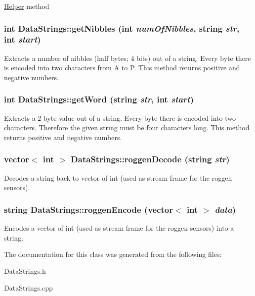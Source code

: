 \label{classDataStrings_ae3279bea5f297a4244c726231489397d}
\hyperlink{classHelper}{Helper} method \hypertarget{classDataStrings_aa2df0794f9ec86503a238a457b963b96}{
\subsubsection[{getNibbles}]{\setlength{\rightskip}{0pt plus 5cm}int DataStrings::getNibbles (int {\em numOfNibbles}, \/  string {\em str}, \/  int {\em start})}}
\label{classDataStrings_aa2df0794f9ec86503a238a457b963b96}
Extracts a number of nibbles (half bytes; 4 bits) out of a string. Every byte there is encoded into two characters from A to P. This method returns positive and negative numbers. \hypertarget{classDataStrings_abb6df04a95c423a6b3f8e9bc5c64c40a}{
\subsubsection[{getWord}]{\setlength{\rightskip}{0pt plus 5cm}int DataStrings::getWord (string {\em str}, \/  int {\em start})}}
\label{classDataStrings_abb6df04a95c423a6b3f8e9bc5c64c40a}
Extracts a 2 byte value out of a string. Every byte there is encoded into two characters. Therefore the given string must be four characters long. This method returns positive and negative numbers. \hypertarget{classDataStrings_a4371afe9ad92957610f64276c5afec19}{
\subsubsection[{roggenDecode}]{\setlength{\rightskip}{0pt plus 5cm}vector$<$ int $>$ DataStrings::roggenDecode (string {\em str})}}
\label{classDataStrings_a4371afe9ad92957610f64276c5afec19}
Decodes a string back to vector of int (used as stream frame for the roggen sensors). \hypertarget{classDataStrings_a1b7a08e71cc0fe63e26a0c508ce8b9f1}{
\subsubsection[{roggenEncode}]{\setlength{\rightskip}{0pt plus 5cm}string DataStrings::roggenEncode (vector$<$ int $>$ {\em data})}}
\label{classDataStrings_a1b7a08e71cc0fe63e26a0c508ce8b9f1}
Encodes a vector of int (used as stream frame for the roggen sensors) into a string. 

The documentation for this class was generated from the following files:\begin{DoxyCompactItemize}
\item 
DataStrings.h\item 
DataStrings.cpp\end{DoxyCompactItemize}
